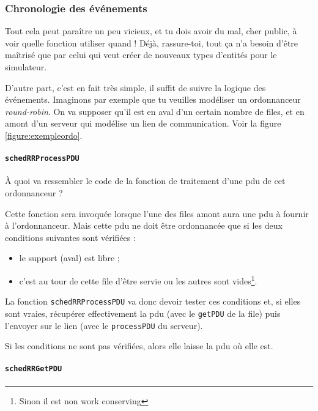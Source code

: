 %
\subsubsection{Chronologie des événements}

  Tout cela peut paraître un peu vicieux, et tu dois avoir du mal,
cher public, à voir quelle fonction utiliser quand ! Déjà,
rassure-toi, tout ça n'a besoin d'être maîtrisé que par celui qui veut
créer de nouveaux types d'entités pour le simulateur.

   D'autre part, c'est en fait très simple, il suffit de suivre la
logique des événements. Imaginons par exemple que tu veuilles
modéliser un ordonnanceur {\em round-robin}. On va supposer qu'il est
en aval d'un certain nombre de files, et en amont d'un serveur qui
modélise un lien de communication. Voir la figure
\ref{figure:exempleordo}.


%
%
%
\paragraph{\lstinline!schedRRProcessPDU!}

   À quoi va ressembler le code de la fonction de traitement d'une
{\sc pdu} de cet ordonnanceur ? 

   Cette fonction sera invoquée lorsque l'une des files amont aura une
{\sc pdu} à fournir à l'ordonnanceur. Mais cette {\sc pdu} ne doit
être ordonnancée que si les deux conditions suivantes sont vérifiées :

\begin{itemize}
   \item le support (aval) est libre ;
   \item c'est au tour de cette file d'être servie ou les autres sont
     vides\footnote{Sinon il est non work conserving}.
\end{itemize}

   La fonction \lstinline!schedRRProcessPDU! va donc devoir tester ces
conditions et, si elles sont vraies, récupérer effectivement la {\sc
  pdu} (avec le \lstinline!getPDU! de la file) puis l'envoyer sur le
lien (avec le \lstinline!processPDU! du serveur). 

   Si les conditions ne sont pas vérifiées, alors elle laisse la {\sc
pdu} où elle est.

%
%
%
\paragraph{\lstinline!schedRRGetPDU!}

